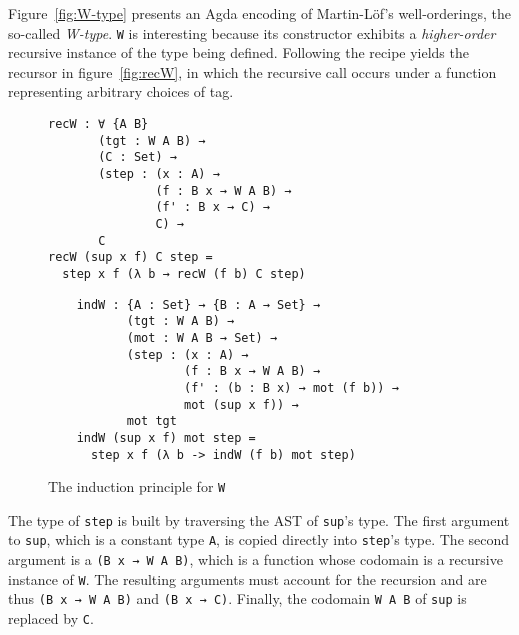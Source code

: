 \documentclass[runningheads]{llncs}
\begin{document}
Figure~\ref{fig:W-type} presents an Agda encoding of Martin-Löf's well-orderings, the so-called \emph{W-type}.
\texttt{W} is interesting because its constructor exhibits a \emph{higher-order} recursive instance of the type being defined.
Following the recipe yields the recursor in figure~\ref{fig:recW}, in which the recursive call occurs under a function representing arbitrary choices of tag.

\begin{figure}
\centering
\begin{minipage}{.5\textwidth}
\centering
\begingroup
\fontsize{7.9pt}{2pt}\selectfont
\begin{Verbatim}
recW : ∀ {A B}
       (tgt : W A B) →
       (C : Set) →
       (step : (x : A) →
               (f : B x → W A B) →
               (f' : B x → C) →
               C) →
       C
recW (sup x f) C step =
  step x f (λ b → recW (f b) C step)
\end{Verbatim}
\endgroup
{}
\label{fig:recW}
\end{minipage}%
\begin{minipage}{.5\textwidth}
\centering
\begingroup
\fontsize{7.9pt}{2pt}\selectfont
\begin{Verbatim}
    indW : {A : Set} → {B : A → Set} →
           (tgt : W A B) →
       	   (mot : W A B → Set) →
           (step : (x : A) →
                   (f : B x → W A B) →
                   (f' : (b : B x) → mot (f b)) →
                   mot (sup x f)) →
           mot tgt
    indW (sup x f) mot step =
      step x f (λ b -> indW (f b) mot step)
\end{Verbatim}
\endgroup
\caption{The induction principle for \texttt{W}}
\label{fig:w-ind}
\end{minipage}
\end{figure}

The type of {\tt step} is built by traversing the AST of {\tt sup}'s type.
The first argument to {\tt sup}, which is a constant type {\tt A}, is copied directly into \texttt{step}'s type.
The second argument is a {\tt (B x → W A B)}, which is a function whose codomain is a recursive instance of {\tt W}.
The resulting arguments must account for the recursion and are thus {\tt (B x → W A B)} and \texttt{(B x → C)}.
Finally, the codomain {\tt W A B} of {\tt sup} is replaced by {\tt C}.
\end{document}
